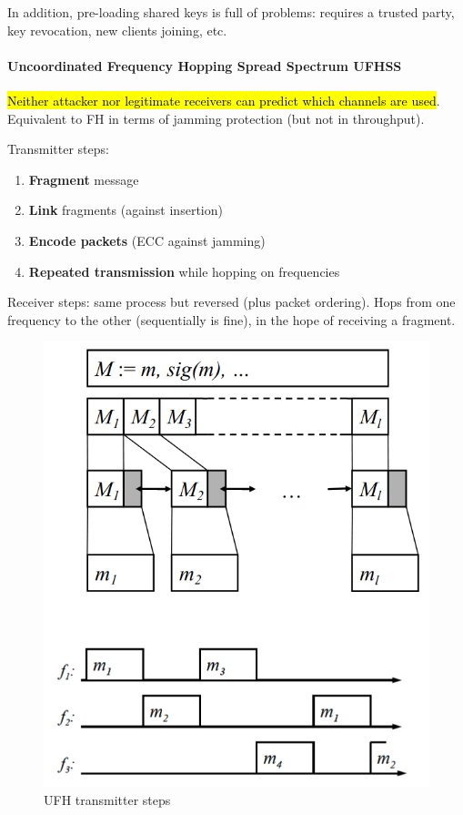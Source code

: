 In addition, pre-loading shared keys is full of problems:
requires a trusted party, key revocation, new clients joining, etc.

\paragraph{Uncoordinated Frequency Hopping Spread Spectrum UFHSS}
\hl{Neither attacker nor legitimate receivers can predict which channels are used}.
Equivalent to FH in terms of jamming protection (but not in throughput).

Transmitter steps:
\begin{enumerate}
	\item \textbf{Fragment} message
	\item \textbf{Link} fragments (against insertion)
	\item \textbf{Encode packets} (ECC against jamming)
	\item \textbf{Repeated transmission} while hopping on frequencies
\end{enumerate}

Receiver steps: same process but reversed (plus packet ordering).
Hops from one frequency to the other (sequentially is fine), in the hope of receiving a fragment.

\begin{figure}[h]
	\centering
	\includegraphics[scale=0.3]{images/3-ufh.png}
	\caption{UFH transmitter steps}%
	\label{fig:ufh}
\end{figure}

